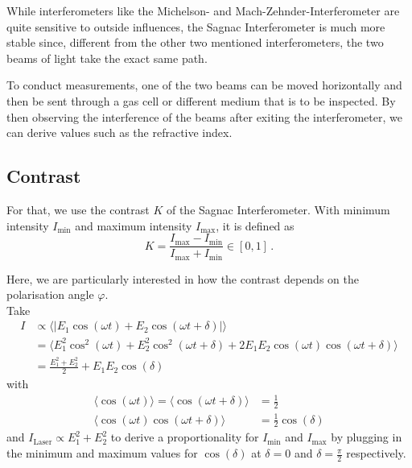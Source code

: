 While interferometers like the Michelson- and Mach-Zehnder-Interferometer are quite sensitive to outside influences, the Sagnac Interferometer is much more stable
since, different from the other two mentioned interferometers, the two beams of light take the exact same path.

To conduct measurements, one of the two beams can be moved horizontally and then be sent through a gas cell or different medium that is to be inspected.
By then observing the interference of the beams after exiting the interferometer, we can derive values such as the refractive index.


\subsection{Contrast}

For that, we use the contrast $K$ of the Sagnac Interferometer.
With minimum intensity $I_{\text{min}}$ and maximum intensity $I_\text{max}$, it is defined as 
\begin{equation}
    K = \frac{I_\text{max} - I_\text{min}}{I_\text{max} + I_\text{min}} \in [0, 1] \,.
    \label{eq:contrast}
\end{equation}

Here, we are particularly interested in how the contrast depends on the polarisation angle $\varphi$. \\

Take
\begin{align*}
    I &\propto \langle | E_1 \cos(\omega t) + E_2 \cos(\omega t + \delta) | \rangle \\
      &= \langle E^2_1 \cos^2(\omega t) + E^2_2 \cos^2(\omega t + \delta) + 2 E_1 E_2 \cos(\omega t) \cos(\omega t + \delta) \rangle \\
      &= \frac{E^2_1 + E^2_2}{2} + E_1E_2 \cos(\delta)
\end{align*}
with 
\begin{align*}
    \langle \cos(\omega t) \rangle = \langle \cos(\omega t + \delta) \rangle &= \frac{1}{2} \\
    \langle \cos(\omega t) \cos(\omega t +\delta) \rangle &= \frac{1}{2} \cos(\delta)
\end{align*}
and $I_\text{Laser} \propto E^2_1 + E^2_2$ to derive a proportionality for $I_\text{min}$ and $I_\text{max}$
by plugging in the minimum and maximum values for $\cos(\delta)$ at $\delta=0$ and $\delta=\frac{\pi}{2}$ respectively. \\

